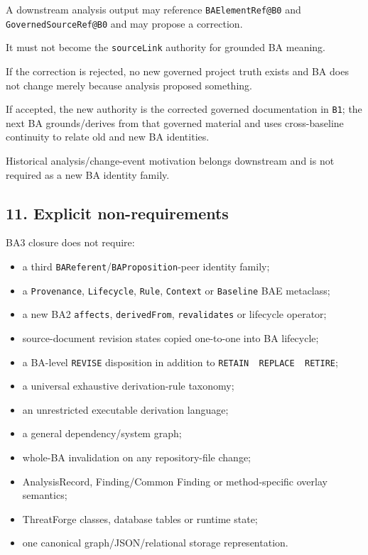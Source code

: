 \documentclass[11pt,a4paper]{article}
\providecommand{\tightlist}{\setlength{\itemsep}{0pt}\setlength{\parskip}{0pt}}
\begin{document}
A downstream analysis output may reference \texttt{BAElementRef@B0} and \texttt{GovernedSourceRef@B0} and may propose a correction.

It must not become the \texttt{sourceLink} authority for grounded BA meaning.

If the correction is rejected, no new governed project truth exists and BA does not change merely because analysis proposed something.

If accepted, the new authority is the corrected governed documentation in \texttt{B1}; the next BA grounds/derives from that governed material and uses cross-baseline continuity to relate old and new BA identities.

Historical analysis/change-event motivation belongs downstream and is not required as a new BA identity family.

\subsection{11. Explicit non-requirements}\label{explicit-non-requirements}

BA3 closure does not require:

\begin{itemize}
\tightlist
\item
  a third \texttt{BAReferent}/\texttt{BAProposition}-peer identity family;
\item
  a \texttt{Provenance}, \texttt{Lifecycle}, \texttt{Rule}, \texttt{Context} or \texttt{Baseline} BAE metaclass;
\item
  a new BA2 \texttt{affects}, \texttt{derivedFrom}, \texttt{revalidates} or lifecycle operator;
\item
  source-document revision states copied one-to-one into BA lifecycle;
\item
  a BA-level \texttt{REVISE} disposition in addition to \texttt{RETAIN\ \textbar{}\ REPLACE\ \textbar{}\ RETIRE};
\item
  a universal exhaustive derivation-rule taxonomy;
\item
  an unrestricted executable derivation language;
\item
  a general dependency/system graph;
\item
  whole-BA invalidation on any repository-file change;
\item
  AnalysisRecord, Finding/Common Finding or method-specific overlay semantics;
\item
  ThreatForge classes, database tables or runtime state;
\item
  one canonical graph/JSON/relational storage representation.
\end{itemize}
\end{document}

